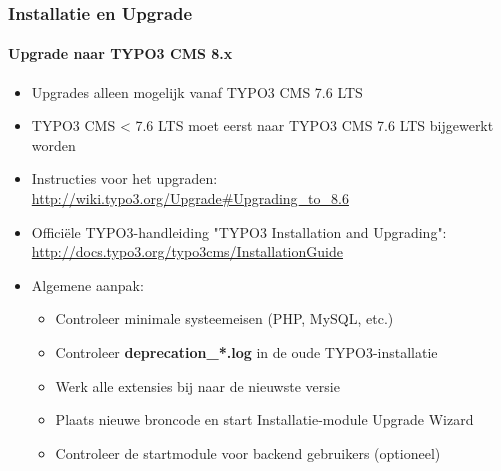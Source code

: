 \begin{frame}[fragile]
	\frametitle{Installatie en Upgrade}
	\framesubtitle{Upgrade naar TYPO3 CMS 8.x}

	\begin{itemize}
		\item Upgrades alleen mogelijk vanaf TYPO3 CMS 7.6 LTS
		\item TYPO3 CMS < 7.6 LTS moet eerst naar TYPO3 CMS 7.6 LTS bijgewerkt worden
	\end{itemize}

	\begin{itemize}

		\item Instructies voor het upgraden:\newline
			\smaller\url{http://wiki.typo3.org/Upgrade#Upgrading_to_8.6}\normalsize
		\item Officiële TYPO3-handleiding "TYPO3 Installation and Upgrading":
			\smaller\url{http://docs.typo3.org/typo3cms/InstallationGuide}\normalsize
		\item Algemene aanpak:
			\begin{itemize}
				\item Controleer minimale systeemeisen \small(PHP, MySQL, etc.)
				\item Controleer \textbf{deprecation\_*.log} in de oude TYPO3-installatie
				\item Werk alle extensies bij naar de nieuwste versie
				\item Plaats nieuwe broncode en start Installatie-module \textrightarrow Upgrade Wizard
				\item Controleer de startmodule voor backend gebruikers (optioneel)
			\end{itemize}
	\end{itemize}

\end{frame}

